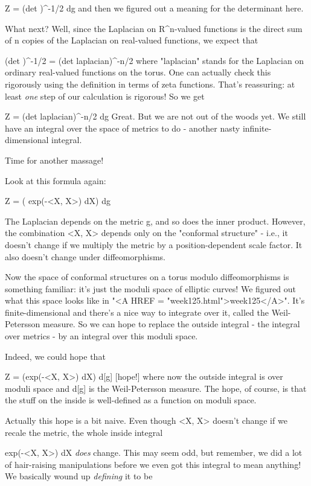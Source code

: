             Z = \int  (det \Delta )^{-1/2} dg
and then we figured out a meaning for the determinant here.

What next?  Well, since the Laplacian on R^{n}-valued functions is the 
direct sum of n copies of the Laplacian on real-valued functions, we 
expect that 

         (det \Delta )^{-1/2} = (det laplacian)^{-n/2}
where "laplacian" stands for the Laplacian on ordinary real-valued
functions on the torus.  One can actually check this rigorously using
the definition in terms of zeta functions.  That's reassuring: at 
least \emph{one} step of our calculation is rigorous!  So we get

                Z = \int  (det laplacian)^{-n/2} dg
Great.  But we are not out of the woods yet.  We still have an integral
over the space of metrics to do - another nasty infinite-dimensional
integral.

Time for another massage!

Look at this formula again:

            Z = \int  ( \int  exp(-<X, \Delta X>) dX) dg

The Laplacian depends on the metric g, and so does the inner product.
However, the combination <X, \Delta X> depends only on the
"conformal structure" - i.e., it doesn't change if we multiply
the metric by a position-dependent scale factor.  It also doesn't change
under diffeomorphisms.

Now the space of conformal structures on a torus modulo diffeomorphisms
is something familiar: it's just the moduli space of elliptic curves!
We figured out what this space looks like in "<A HREF =
"week125.html">week125</A>".  It's finite-dimensional and there's a
nice way to integrate over it, called the Weil-Petersson measure.  So we
can hope to replace the outside integral - the integral over metrics -
by an integral over this moduli space.

Indeed, we could hope that

      Z = \int  (\int  exp(-<X, \Delta X>) dX) d[g]   
      [hope!]
where now the outside integral is over moduli space and d[g] is 
the Weil-Petersson measure.  The hope, of course, is that the 
stuff on the inside is well-defined as a function on moduli space.

Actually this hope is a bit naive.  Even though <X, \Delta X> 
doesn't change if we recale the metric, the whole inside integral

            \int  exp(-<X, \Delta X>) dX 
\emph{does} change.  This may seem odd, but remember, we did a lot of
hair-raising manipulations before we even got this integral to mean
anything!  We basically wound up \emph{defining} it to be 

